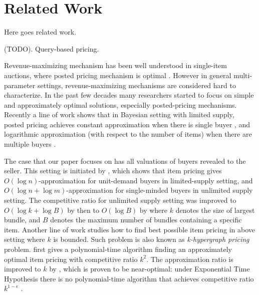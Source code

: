 \section{Related Work}
\label{sec:related}

Here goes related work.

(TODO). Query-based pricing.

Revenue-maximizing mechanism has been well understood in single-item auctions, where posted pricing
mechanism is optimal \cite{myerson1981optimal}. 
However in general multi-parameter settings, revenue-maximizing mechanisms are considered
hard to characterize. In the past few decades many researchers started to 
focus on simple and approximately optimal solutions, especially posted-pricing mechanisms.
Recently a line of work shows that in Bayesian setting with limited supply, posted pricing achieves 
constant approximation when there is single buyer 
\cite{babaioff2014simple, chawla2007algorithmic, 
chawla2010multi, chawla2015power, rubinstein2015simple},
and logarithmic approximation (with respect to the number of items) when there are multiple buyers 
\cite{cai2016duality, chawla2016mechanism, caizhao2017duality}.

The case that our paper focuses on has all valuations of buyers revealed to the seller. This setting
is initiated by \cite{guruswami2005profit}, which shows that item pricing 
gives $O(\log n)$-approximation for unit-demand buyers
in limited-supply setting, and $O(\log n+\log m)$-approximation for single-minded buyers in unlimited supply
setting. The competitive ratio for unlimited supply setting was improved to $O(\log k + \log B)$ 
by \cite{briest2006single} then to $O(\log B)$ by \cite{cheung2008approximation} where 
$k$ denotes the size of largest bundle, and $B$ denotes the maximum number of bundles containing a specific item.
Another line of work studies how to find best possible item pricing in above setting where $k$ is bounded. Such problem 
is also known as \textit{k-hypergraph pricing} problem.
\cite{briest2006single} first gives a polynomial-time algorithm finding an approximately optimal item pricing
with competitive ratio $k^2$. The approximation ratio is improved to $k$ by \cite{balcan2006approximation},
which is proven to be near-optimal: under Exponential Time Hypothesis there is no polynomial-time algorithm 
that achieves competitive ratio $k^{1-\epsilon}$ \cite{chalermsook2013independent}.

